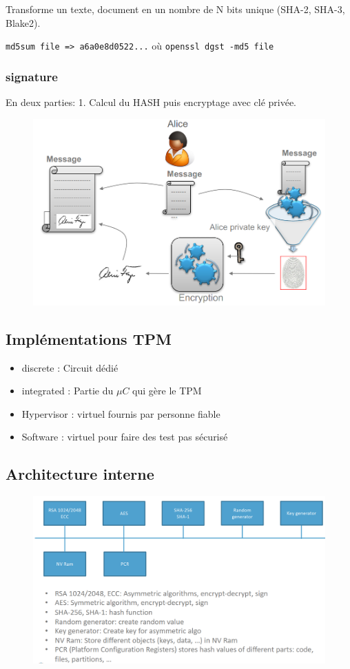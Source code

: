 \documentclass[resume]{subfiles}
\begin{document}
Transforme un texte, document en un nombre de N bits unique (SHA-2, SHA-3, Blake2).

\verb!md5sum file => a6a0e8d0522...! 
où
\verb!openssl dgst -md5 file!  

\subsubsection{signature}
\label{sec_sign}
En deux parties: 1. Calcul du HASH puis encryptage avec clé privée. 
\begin{figure}[H]
    \centering
    \includegraphics[width=0.7\columnwidth]{Figures/TPM/signature.png}
\end{figure}

\subsection{Implémentations TPM}
\begin{itemize}
\item discrete : Circuit dédié 
\item integrated : Partie du $\mu C$ qui gère le TPM
\item Hypervisor : virtuel fournis par personne fiable
\item Software : virtuel pour faire des test pas sécurisé
\end{itemize}

\subsection{Architecture interne}

\begin{figure}[H]
    \centering
    \includegraphics[width=\columnwidth]{Figures/TPM/internal.png}
\end{figure}
\end{document}
